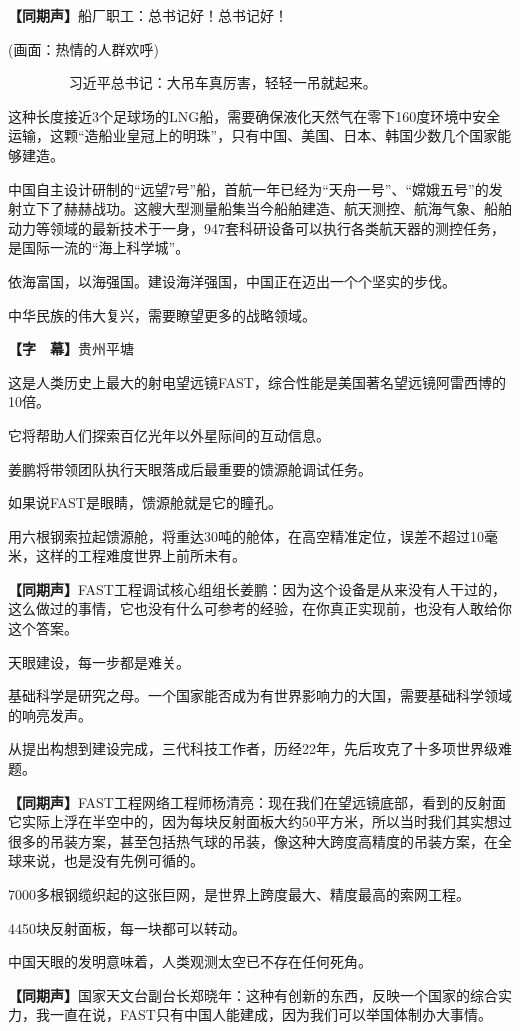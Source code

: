 \documentclass{ctexart}
\newcommand{\zkh}[1]{\textbf{\hspace{-2.7em} 【#1】}}
\begin{document}
 \zkh{同期声}船厂职工：总书记好！总书记好！

 (画面：热情的人群欢呼)

 　　　　 习近平总书记：大吊车真厉害，轻轻一吊就起来。

 
这种长度接近3个足球场的LNG船，需要确保液化天然气在零下160度环境中安全运输，这颗``造船业皇冠上的明珠''，只有中国、美国、日本、韩国少数几个国家能够建造。

中国自主设计研制的``远望7号''船，首航一年已经为``天舟一号''、``嫦娥五号''的发射立下了赫赫战功。这艘大型测量船集当今船舶建造、航天测控、航海气象、船舶动力等领域的最新技术于一身，947套科研设备可以执行各类航天器的测控任务，是国际一流的``海上科学城''。

 依海富国，以海强国。建设海洋强国，中国正在迈出一个个坚实的步伐。

 中华民族的伟大复兴，需要瞭望更多的战略领域。

 \zkh{字　幕}贵州平塘

 
这是人类历史上最大的射电望远镜FAST，综合性能是美国著名望远镜阿雷西博的10倍。

 它将帮助人们探索百亿光年以外星际间的互动信息。

 姜鹏将带领团队执行天眼落成后最重要的馈源舱调试任务。

 如果说FAST是眼睛，馈源舱就是它的瞳孔。

用六根钢索拉起馈源舱，将重达30吨的舱体，在高空精准定位，误差不超过10毫米，这样的工程难度世界上前所未有。

 \zkh{同期声}FAST工程调试核心组组长姜鹏：因为这个设备是从来没有人干过的，这么做过的事情，它也没有什么可参考的经验，在你真正实现前，也没有人敢给你这个答案。

 天眼建设，每一步都是难关。

基础科学是研究之母。一个国家能否成为有世界影响力的大国，需要基础科学领域的响亮发声。

从提出构想到建设完成，三代科技工作者，历经22年，先后攻克了十多项世界级难题。

 \zkh{同期声}FAST工程网络工程师杨清亮：现在我们在望远镜底部，看到的反射面它实际上浮在半空中的，因为每块反射面板大约50平方米，所以当时我们其实想过很多的吊装方案，甚至包括热气球的吊装，像这种大跨度高精度的吊装方案，在全球来说，也是没有先例可循的。

 
7000多根钢缆织起的这张巨网，是世界上跨度最大、精度最高的索网工程。

 4450块反射面板，每一块都可以转动。

 中国天眼的发明意味着，人类观测太空已不存在任何死角。

 \zkh{同期声}国家天文台副台长郑晓年：这种有创新的东西，反映一个国家的综合实力，我一直在说，FAST只有中国人能建成，因为我们可以举国体制办大事情。
\end{document}
